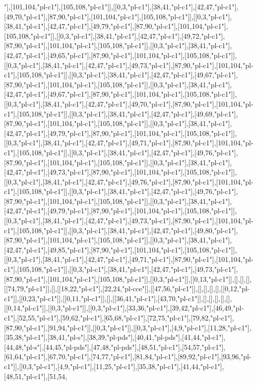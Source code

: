 "],[101,104,"pl-c1"],[105,108,"pl-c1"]],[[0,3,"pl-c1"],[38,41,"pl-c1"],[42,47,"pl-c1"],[49,70,"pl-c1"],[87,90,"pl-c1"],[101,104,"pl-c1"],[105,108,"pl-c1"]],[[0,3,"pl-c1"],[38,41,"pl-c1"],[42,47,"pl-c1"],[49,79,"pl-c1"],[87,90,"pl-c1"],[101,104,"pl-c1"],[105,108,"pl-c1"]],[[0,3,"pl-c1"],[38,41,"pl-c1"],[42,47,"pl-c1"],[49,72,"pl-c1"],[87,90,"pl-c1"],[101,104,"pl-c1"],[105,108,"pl-c1"]],[[0,3,"pl-c1"],[38,41,"pl-c1"],[42,47,"pl-c1"],[49,65,"pl-c1"],[87,90,"pl-c1"],[101,104,"pl-c1"],[105,108,"pl-c1"]],[[0,3,"pl-c1"],[38,41,"pl-c1"],[42,47,"pl-c1"],[49,73,"pl-c1"],[87,90,"pl-c1"],[101,104,"pl-c1"],[105,108,"pl-c1"]],[[0,3,"pl-c1"],[38,41,"pl-c1"],[42,47,"pl-c1"],[49,67,"pl-c1"],[87,90,"pl-c1"],[101,104,"pl-c1"],[105,108,"pl-c1"]],[[0,3,"pl-c1"],[38,41,"pl-c1"],[42,47,"pl-c1"],[49,67,"pl-c1"],[87,90,"pl-c1"],[101,104,"pl-c1"],[105,108,"pl-c1"]],[[0,3,"pl-c1"],[38,41,"pl-c1"],[42,47,"pl-c1"],[49,70,"pl-c1"],[87,90,"pl-c1"],[101,104,"pl-c1"],[105,108,"pl-c1"]],[[0,3,"pl-c1"],[38,41,"pl-c1"],[42,47,"pl-c1"],[49,69,"pl-c1"],[87,90,"pl-c1"],[101,104,"pl-c1"],[105,108,"pl-c1"]],[[0,3,"pl-c1"],[38,41,"pl-c1"],[42,47,"pl-c1"],[49,79,"pl-c1"],[87,90,"pl-c1"],[101,104,"pl-c1"],[105,108,"pl-c1"]],[[0,3,"pl-c1"],[38,41,"pl-c1"],[42,47,"pl-c1"],[49,71,"pl-c1"],[87,90,"pl-c1"],[101,104,"pl-c1"],[105,108,"pl-c1"]],[[0,3,"pl-c1"],[38,41,"pl-c1"],[42,47,"pl-c1"],[49,76,"pl-c1"],[87,90,"pl-c1"],[101,104,"pl-c1"],[105,108,"pl-c1"]],[[0,3,"pl-c1"],[38,41,"pl-c1"],[42,47,"pl-c1"],[49,73,"pl-c1"],[87,90,"pl-c1"],[101,104,"pl-c1"],[105,108,"pl-c1"]],[[0,3,"pl-c1"],[38,41,"pl-c1"],[42,47,"pl-c1"],[49,76,"pl-c1"],[87,90,"pl-c1"],[101,104,"pl-c1"],[105,108,"pl-c1"]],[[0,3,"pl-c1"],[38,41,"pl-c1"],[42,47,"pl-c1"],[49,76,"pl-c1"],[87,90,"pl-c1"],[101,104,"pl-c1"],[105,108,"pl-c1"]],[[0,3,"pl-c1"],[38,41,"pl-c1"],[42,47,"pl-c1"],[49,79,"pl-c1"],[87,90,"pl-c1"],[101,104,"pl-c1"],[105,108,"pl-c1"]],[[0,3,"pl-c1"],[38,41,"pl-c1"],[42,47,"pl-c1"],[49,73,"pl-c1"],[87,90,"pl-c1"],[101,104,"pl-c1"],[105,108,"pl-c1"]],[[0,3,"pl-c1"],[38,41,"pl-c1"],[42,47,"pl-c1"],[49,80,"pl-c1"],[87,90,"pl-c1"],[101,104,"pl-c1"],[105,108,"pl-c1"]],[[0,3,"pl-c1"],[38,41,"pl-c1"],[42,47,"pl-c1"],[49,85,"pl-c1"],[87,90,"pl-c1"],[101,104,"pl-c1"],[105,108,"pl-c1"]],[[0,3,"pl-c1"],[38,41,"pl-c1"],[42,47,"pl-c1"],[49,71,"pl-c1"],[87,90,"pl-c1"],[101,104,"pl-c1"],[105,108,"pl-c1"]],[[0,3,"pl-c1"],[38,41,"pl-c1"],[42,47,"pl-c1"],[49,73,"pl-c1"],[87,90,"pl-c1"],[101,104,"pl-c1"],[105,108,"pl-c1"]],[[0,3,"pl-c1"]],[[0,13,"pl-c1"]],[],[],[],[[74,79,"pl-c1"]],[],[[18,22,"pl-c1"],[22,24,"pl-cce"]],[[47,56,"pl-c1"]],[],[],[],[],[[0,12,"pl-c1"]],[[0,23,"pl-c1"]],[[0,11,"pl-c1"]],[],[[36,41,"pl-c1"],[43,70,"pl-c1"]],[],[],[],[],[],[[0,14,"pl-c1"]],[[0,3,"pl-c1"]],[[0,3,"pl-c1"],[33,36,"pl-c1"],[39,42,"pl-c1"],[46,49,"pl-c1"],[52,55,"pl-c1"],[59,62,"pl-c1"],[65,68,"pl-c1"],[72,75,"pl-c1"],[79,82,"pl-c1"],[87,90,"pl-c1"],[91,94,"pl-c1"]],[[0,3,"pl-c1"]],[[0,3,"pl-c1"],[4,9,"pl-c1"],[11,28,"pl-c1"],[35,38,"pl-c1"],[38,41,"pl-s"],[38,39,"pl-pds"],[40,41,"pl-pds"],[41,44,"pl-c1"],[44,48,"pl-s"],[44,45,"pl-pds"],[47,48,"pl-pds"],[48,51,"pl-c1"],[54,57,"pl-c1"],[61,64,"pl-c1"],[67,70,"pl-c1"],[74,77,"pl-c1"],[81,84,"pl-c1"],[89,92,"pl-c1"],[93,96,"pl-c1"]],[[0,3,"pl-c1"],[4,9,"pl-c1"],[11,25,"pl-c1"],[35,38,"pl-c1"],[41,44,"pl-c1"],[48,51,"pl-c1"],[51,54,